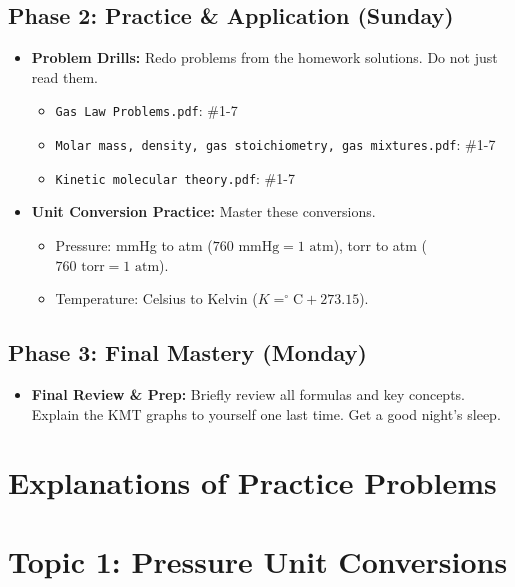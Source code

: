 \documentclass{article}
\begin{document}
\subsection{Phase 2: Practice \& Application (Sunday)}
\begin{itemize}
    \item \textbf{Problem Drills:} Redo problems from the homework solutions. Do not just read them.
    \begin{itemize}
        \item \texttt{Gas Law Problems.pdf}: \#1-7
        \item \texttt{Molar mass, density, gas stoichiometry, gas mixtures.pdf}: \#1-7
        \item \texttt{Kinetic molecular theory.pdf}: \#1-7
    \end{itemize}
    \item \textbf{Unit Conversion Practice:} Master these conversions.
    \begin{itemize}
        \item Pressure: mmHg to atm ($760 \text{ mmHg} = 1 \text{ atm}$), torr to atm ($760 \text{ torr} = 1 \text{ atm}$).
        \item Temperature: Celsius to Kelvin ($K = ^\circ\text{C} + 273.15$).
    \end{itemize}
\end{itemize}

\subsection{Phase 3: Final Mastery (Monday)}
\begin{itemize}
    \item \textbf{Final Review \& Prep:} Briefly review all formulas and key concepts. Explain the KMT graphs to yourself one last time. Get a good night's sleep.
\end{itemize}

\section{Explanations of Practice Problems}

\section{Topic 1: Pressure Unit Conversions}
\end{document}
